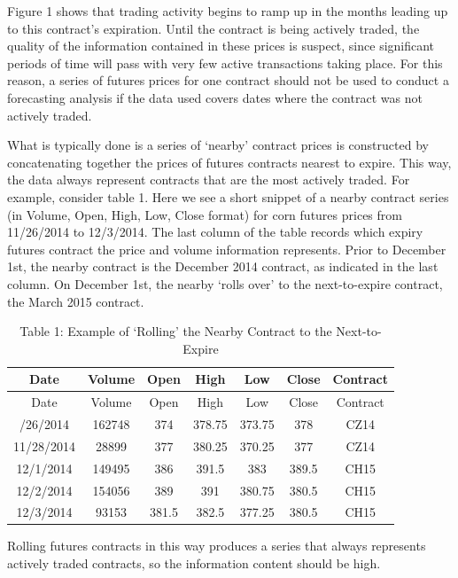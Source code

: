 \documentclass[
  letterpaper,
  DIV=11,
  numbers=noendperiod]{scrreprt}
\begin{document}
Figure 1 shows that trading activity begins to ramp up in the months
leading up to this contract's expiration. Until the contract is being
actively traded, the quality of the information contained in these
prices is suspect, since significant periods of time will pass with very
few active transactions taking place. For this reason, a series of
futures prices for one contract should not be used to conduct a
forecasting analysis if the data used covers dates where the contract
was not actively traded.

What is typically done is a series of `nearby' contract prices is
constructed by concatenating together the prices of futures contracts
nearest to expire. This way, the data always represent contracts that
are the most actively traded. For example, consider table 1. Here we see
a short snippet of a nearby contract series (in Volume, Open, High, Low,
Close format) for corn futures prices from 11/26/2014 to 12/3/2014. The
last column of the table records which expiry futures contract the price
and volume information represents. Prior to December 1st, the nearby
contract is the December 2014 contract, as indicated in the last column.
On December 1st, the nearby `rolls over' to the next-to-expire contract,
the March 2015 contract.

\begin{longtable}[]{@{}ccccccc@{}}
\caption{Table 1: Example of `Rolling' the Nearby Contract to the
Next-to-Expire}\tabularnewline
\toprule\noalign{}
Date & Volume & Open & High & Low & Close & Contract \\
\midrule\noalign{}
\endfirsthead
\toprule\noalign{}
Date & Volume & Open & High & Low & Close & Contract \\
\midrule\noalign{}
\endhead
\bottomrule\noalign{}
\endlastfoot
11/26/2014 & 162748 & 374 & 378.75 & 373.75 & 378 & CZ14 \\
11/28/2014 & 28899 & 377 & 380.25 & 370.25 & 377 & CZ14 \\
12/1/2014 & 149495 & 386 & 391.5 & 383 & 389.5 & CH15 \\
12/2/2014 & 154056 & 389 & 391 & 380.75 & 380.5 & CH15 \\
12/3/2014 & 93153 & 381.5 & 382.5 & 377.25 & 380.5 & CH15 \\
\end{longtable}

Rolling futures contracts in this way produces a series that always
represents actively traded contracts, so the information content should
be high.
\end{document}
